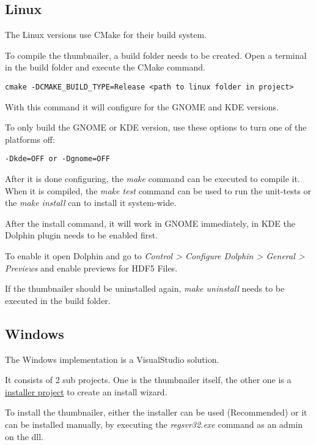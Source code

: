 \subsection{Linux}

The Linux versions use CMake for their build system.

To compile the thumbnailer, a build folder needs to be created.
Open a terminal in the build folder and execute the CMake command.

\begin{lstlisting}
cmake -DCMAKE_BUILD_TYPE=Release <path to linux folder in project>
\end{lstlisting}

With this command it will configure for the GNOME and KDE versions.

To only build the GNOME or KDE version, use these options to turn one of the platforms off:
\begin{lstlisting}
-Dkde=OFF or -Dgnome=OFF
\end{lstlisting}

After it is done configuring, the \emph{make} command can be executed to compile it.
When it is compiled, the \emph{make test} command can be used to run the unit-tests or
the \emph{make install} can to install it system-wide.

After the install command, it will work in GNOME immediately, in KDE the Dolphin plugin needs to be enabled first.

To enable it open Dolphin and go to \emph{Control > Configure Dolphin > General > Previews}
and enable previews for HDF5 Files.

If the thumbnailer should be uninstalled again, \emph{make uninstall} needs to be executed in the build folder.

\subsection{Windows}

The Windows implementation is a VisualStudio solution.

It consists of 2 sub projects. One is the thumbnailer itself,
the other one is a \href{https://marketplace.visualstudio.com/items?itemName=VisualStudioProductTeam.MicrosoftVisualStudio2017InstallerProjects}{installer project}
to create an install wizard.

To install the thumbnailer, either the installer can be used (Recommended) or it can be installed manually,
by executing the \emph{regsvr32.exe} command as an admin on the dll.